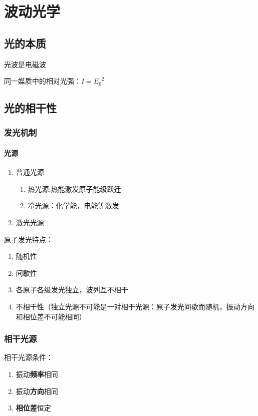 \chapter{波动光学}

\section{光的本质}

光波是电磁波

同一媒质中的相对光强：$I={E_0}^2$

\section{光的相干性}

\subsection{发光机制}

\subsubsection{光源}

\begin{enumerate}
    \item 普通光源
          \begin{enumerate}
              \item 热光源:热能激发原子能级跃迁
              \item 冷光源：化学能，电能等激发
          \end{enumerate}
    \item 激光光源
\end{enumerate}

原子发光特点：
\begin{enumerate}
    \item 随机性
    \item 间歇性
    \item 各原子各级发光独立，波列互不相干
    \item 不相干性（独立光源不可能是一对相干光源：原子发光间歇而随机，振动方向和相位差不可能相同）
\end{enumerate}

\subsection{相干光源}

相干光源条件：
\begin{enumerate}
    \item 振动\textbf{频率}相同
    \item 振动\textbf{方向}相同
    \item \textbf{相位差}恒定
\end{enumerate}

